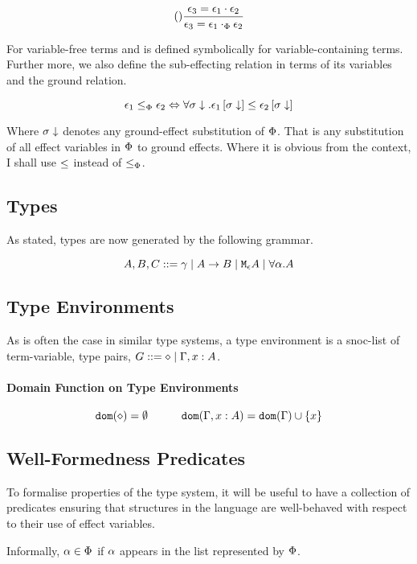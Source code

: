 \documentclass{Report}
\begin{document}
\begin{equation}
    \treerule{}{\e_3 = \e_1\dot\e_2}{\e_3 = \e_1\dotp\e_2}
\end{equation} 

For variable-free terms and is defined symbolically for variable-containing terms. Further more, we also define the sub-effecting relation in terms of its variables and the ground relation.

\begin{equation}
    \e_1 \subeffectp \e_2 \Leftrightarrow \forall \si\downarrow. \e_1\sub{\si\downarrow} \subeffect \e_2\sub{\si\downarrow}
\end{equation}

Where $\si\downarrow$ denotes any ground-effect substitution of $\P$. That is any substitution of all effect variables in $\P$ to ground effects. Where it is obvious from the context, I shall use $\subeffect$ instead of $\subeffectp$.


\subsection{Types}
As stated, types are now generated by the following grammar.

$$ A, B, C \gens \ground \mid \ab \mid \mea \mid \all{\a}{A}$$
  
\subsection{Type Environments}
As is often the case in similar type systems, a type environment is a snoc-list of term-variable, type pairs, $G \gens \nil \mid \gax$.

\paragraph{Domain Function on Type Environments}

\[
    \dom{\nil} = \emptyset
    \quad\quad\quad
    \dom{\gax} =  \dom{\G}  \cup \left\{x \right\}
\]

\subsection{Well-Formedness Predicates}
To formalise properties of the type system, it will be useful to have a collection of predicates ensuring that structures in the language are well-behaved with respect to their use of effect variables.

Informally, $\a \in \P$ if $\a$ appears in the list represented by $\P$.
\end{document}
